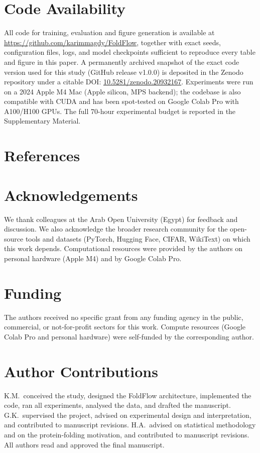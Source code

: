 \documentclass[fleqn,10pt]{article}
\begin{document}
\section*{Code Availability}
\label{sec:code}
All code for training, evaluation and figure generation is
available at \url{https://github.com/karimmagdy/FoldFlow}, together
with exact seeds, configuration files, logs, and model checkpoints
sufficient to reproduce every table and figure in this paper. A
permanently archived snapshot of the exact code version used for
this study (GitHub release v1.0.0) is deposited in the Zenodo
repository under a citable DOI:
\href{https://doi.org/10.5281/zenodo.20932167}{10.5281/zenodo.20932167}.
Experiments were
run on a 2024 Apple M4 Mac (Apple silicon, MPS backend); the
codebase is also compatible with CUDA and has been spot-tested on
Google Colab Pro with A100/H100 GPUs. The full 70-hour experimental
budget is reported in the Supplementary Material.

\section*{References}
\renewcommand{\refname}{}
\vspace{-2em}



\section*{Acknowledgements}
We thank colleagues at the Arab Open University (Egypt) for
feedback and discussion. We also acknowledge the broader research
community for the open-source tools and datasets (PyTorch, Hugging
Face, CIFAR, WikiText) on which this work depends. Computational
resources were provided by the authors on personal hardware (Apple
M4) and by Google Colab Pro.

\section*{Funding}
The authors received no specific grant from any funding agency in the
public, commercial, or not-for-profit sectors for this work. Compute
resources (Google Colab Pro and personal hardware) were self-funded
by the corresponding author.

\section*{Author Contributions}
K.M.\ conceived the study, designed the FoldFlow architecture,
implemented the code, ran all experiments, analysed the data, and
drafted the manuscript. G.K.\ supervised the project, advised on
experimental design and interpretation, and contributed to
manuscript revisions. H.A.\ advised on statistical methodology and
on the protein-folding motivation, and contributed to manuscript
revisions. All authors read and approved the final manuscript.
\end{document}

